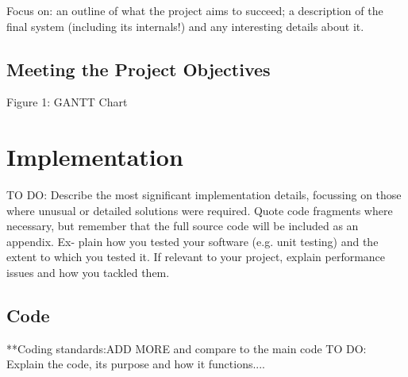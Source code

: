 \documentclass{article}[11pt,Tahoma]
\begin{document}
\begin{Abstract}
		 	Focus on: an outline of what the project aims to succeed; a description of the final system (including its internals!) and any interesting details about it.
		 \subsection{Meeting the Project Objectives} 
		 	Figure 1: GANTT Chart

	\section{Implementation}
		TO DO: Describe the most significant implementation details, focussing on those where unusual or detailed solutions were required. Quote code fragments where necessary, but remember that the full source code will be included as an appendix. Ex- plain how you tested your software (e.g. unit testing) and the extent to which you tested it. If relevant to your project, explain performance issues and how you tackled them.
		\subsection{Code}
			**Coding standards:ADD MORE and compare to the main code
			TO DO: Explain the code, its purpose and how it functions....

\end{Abstract}
\end{document}
